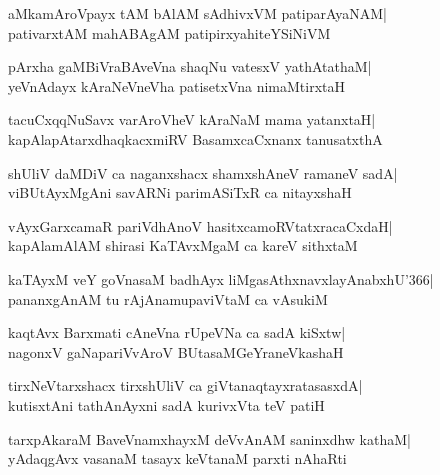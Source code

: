 \documentclass[twoside,12pt,openright]{book}
\newcounter{shloka}[chapter]
\begin{document}
\begin{shloka}%
aMkamAroVpayx tAM bAlAM sAdhivxVM patiparAyaNAM|\\
pativarxtAM mahABAgAM patipirxyahiteYSiNiVM
\end{shloka}

\begin{shloka}%
pArxha gaMBiVraBAveVna shaqNu vatesxV yathAtathaM|\\
yeVnAdayx kAraNeVneVha patisetxVna nimaMtirxtaH
\end{shloka}

\begin{shloka}%
tacuCxqqNuSavx varAroVheV kAraNaM mama yatanxtaH|\\
kapAlapAtarxdhaqkacxmiRV BasamxcaCxnanx tanusatxthA
\end{shloka}

\begin{shloka}%
shUliV daMDiV ca naganxshacx shamxshAneV ramaneV sadA|\\
viBUtAyxMgAni savARNi parimASiTxR ca nitayxshaH
\end{shloka}

\begin{shloka}%
vAyxGarxcamaR pariVdhAnoV hasitxcamoRVtatxracaCxdaH|\\
kapAlamAlAM shirasi KaTAvxMgaM ca kareV sithxtaM
\end{shloka}

\begin{shloka}%
kaTAyxM veY goVnasaM badhAyx liMgasAthxnavxlayAnabxhU\char'366|\\
pananxgAnAM tu rAjAnamupaviVtaM ca vAsukiM
\end{shloka}

\begin{shloka}%
kaqtAvx Barxmati cAneVna rUpeVNa ca sadA kiSxtw|\\
nagonxV gaNapariVvAroV BUtasaMGeYraneVkashaH
\end{shloka}

\begin{shloka}%
tirxNeVtarxshacx tirxshUliV ca giVtanaqtayxratasasxdA|\\
kutisxtAni tathAnAyxni sadA kurivxVta teV patiH
\end{shloka}

\begin{shloka}%
tarxpAkaraM BaveVnamxhayxM deVvAnAM saninxdhw kathaM|\\
yAdaqgAvx vasanaM tasayx keVtanaM parxti nAhaRti
\end{shloka}
\end{document}
